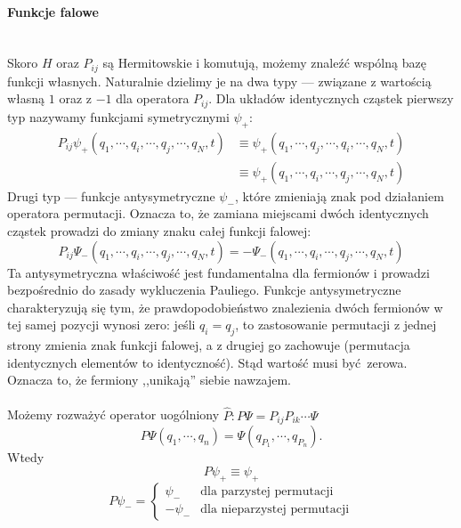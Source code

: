 \paragraph*{Funkcje falowe}\mbox{}\\
%
Skoro $H$ oraz $P_{ij}$ są Hermitowskie i komutują, możemy znaleźć wspólną bazę
funkcji własnych. Naturalnie dzielimy je na dwa typy --- związane z wartością
własną $1$ oraz z $-1$ dla operatora $P_{ij}$.
Dla układów identycznych cząstek
pierwszy typ nazywamy funkcjami symetrycznymi $\psi_+$:
%
\begin{equation*}
    \begin{aligned}
        P_{ij} \psi_+ (q_1, \cdots, q_i, \cdots, q_j, \cdots, q_N, t) &\equiv \psi_+ (q_1, \cdots, q_j, \cdots, q_i, \cdots, q_N, t) \\
        &\equiv \psi_+ (q_1, \cdots, q_i, \cdots, q_j, \cdots, q_N, t)
    \end{aligned}
\end{equation*}
%
Drugi typ --- funkcje antysymetryczne $\psi_-$, które zmieniają znak
pod działaniem operatora permutacji.
Oznacza to, że zamiana miejscami dwóch identycznych cząstek prowadzi
do zmiany znaku całej funkcji falowej:
%
\begin{equation*}
    P_{ij} \Psi_- (q_1, \cdots, q_i, \cdots, q_j, \cdots, q_N, t) = - \Psi_- (q_1, \cdots, q_i, \cdots, q_j, \cdots, q_N, t)
\end{equation*}
Ta antysymetryczna właściwość jest fundamentalna dla fermionów i prowadzi bezpośrednio do zasady wykluczenia Pauliego.
Funkcje antysymetryczne charakteryzują się tym, że prawdopodobieństwo
znalezienia dwóch fermionów w tej samej pozycji wynosi zero:
jeśli $q_i = q_j$, to zastosowanie permutacji z jednej strony zmienia
znak funkcji falowej, a z drugiej go zachowuje (permutacja identycznych
elementów to identyczność). Stąd wartość musi być zerowa.
Oznacza to, że fermiony ,,unikają'' siebie nawzajem.
%
\\ \\
%
Możemy rozważyć operator uogólniony $\hat{P}: P \Psi = P_{ij}P_{ik} \cdots \Psi$
%
\begin{equation*}
    P \Psi  (q_1, \cdots, q_n) = \Psi(q_{P_1}, \cdots, q_{P_n}).
\end{equation*}
%
Wtedy
\begin{equation*}
    P \psi_+ \equiv \psi_+
\end{equation*}
%
\begin{equation*}
    P \psi_- =
    \begin{cases}
        \psi_- & \text{dla parzystej permutacji} \\
        - \psi_- & \text{dla nieparzystej permutacji}
    \end{cases}
\end{equation*}
%
